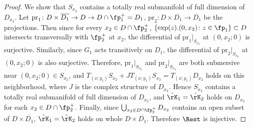 \begin{proof}
We show that $S_{x_2}$ contains a totally real submanifold of full dimension of $D_{x_2}$.
Let $\mathrm{pr}_1\colon D\times\overline{D_1}\to D\to D\cap\fp^+_1=D_1$, $\mathrm{pr}_2\colon D\times\overline{D_1}\to \overline{D_1}$
be the projections. Then since for every $x_2\in D\cap\fp^+_2$, $\{\exp(z).(0,x_2)\colon z\in\fp_1\}\subset D$ intersects transversally
with $\fp^+_2$ at $x_2$, the differential of $\mathrm{pr}_1|_{S_{x_2}}$ at $(0,x_2;0)$ is surjective.
Similarly, since $G_1$ acts transitively on $D_1$, the differential of $\mathrm{pr}_2|_{S_{x_2}}$ at $(0,x_2;0)$ is also surjective.
Therefore, $\mathrm{pr}_1|_{S_{x_2}}$ and $\mathrm{pr}_2|_{S_{x_2}}$ are both submersive near $(0,x_2;0)\in S_{x_2}$,
and $T_{(x;y_1)}S_{x_2}+JT_{(x;y_1)}S_{x_2}=T_{(x;y_1)}D_{x_2}$ holds on this neighborhood,
where $J$ is the complex structure of $D_{x_2}$. Hence $S_{x_2}$ contains a totally real submanifold of full dimension of $D_{x_2}$,
and $\hat{\rK}_1=\hat{\rK}_2$ holds on $D_{x_2}$ for each $x_2\in D\cap\fp^+_2$.
Finally, since $\bigcup_{x_2\in D\cap\fp^+_2} D_{x_2}$ contains an open subset of $D\times\overline{D_1}$,
$\hat{\rK}_1=\hat{\rK}_2$ holds on whole $D\times\overline{D_1}$. Therefore $\Rest$ is injective.
\end{proof}

